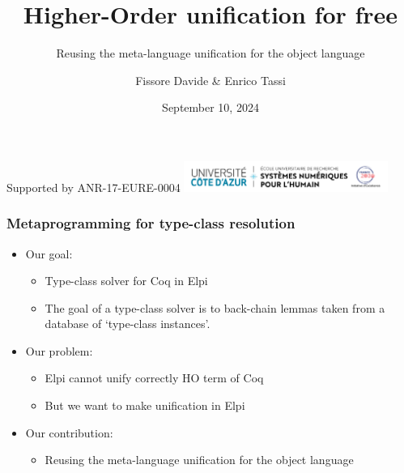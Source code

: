 \documentclass{pres}
\author{Fissore Davide \& Enrico Tassi}
\title{Higher-Order unification for free}
\subtitle{Reusing the meta-language unification for the object language}
\date{September 10, 2024}
\newcommand{\sepFrame}[1]{
  \section{#1}
  \begin{frame}
    \centering
    {\usebeamerfont*{frametitle}\usebeamercolor[fg]{frametitle} #1}
  \end{frame}
}
\begin{document}


\begin{frame}
  \titlepage
  \tiny Supported by ANR-17-EURE-0004 \hfill \includegraphics[height=1cm,valign=c]{UCA_DS4H_France2030.png}
\end{frame}





\begin{frame}[fragile]
  \frametitle{Metaprogramming for type-class resolution}

  \begin{itemize}
    \item Our goal:
          \begin{itemize}
            \item Type-class solver for Coq in Elpi
            \item The goal of a type-class solver is to back-chain lemmas
                  taken from a database of `type-class instances'. 
          \end{itemize}
    \item Our problem:
          \begin{itemize}
            \item Elpi cannot unify correctly HO term of Coq
            \item But we want to make unification in Elpi
          \end{itemize}
    \item Our contribution:
          \begin{itemize}
            \item Reusing the meta-language unification for the object language
          \end{itemize}
  \end{itemize}

\end{frame}
\end{document}
